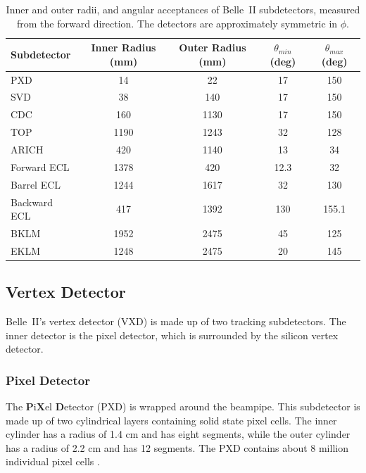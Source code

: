 \begin{table}[ht]
	\centering
	\begin{tabular}{ lcccc }
Subdetector	&	Inner Radius (mm)	&	Outer Radius (mm)	&	$\theta_{min}$ (deg)	&	$\theta_{max}$ (deg)	\\	\hline \hline
PXD	&	14	&	22	&	17	&	150	\\	
SVD	&	38	&	140	&	17	&	150	\\	
CDC	&	160	&	1130	&	17	&	150	\\	
TOP	&	1190	&	1243	&	32	&	128	\\	
ARICH	&	420	&	1140	&	13	&	34	\\	
Forward ECL	&	1378	&	420	&	12.3	&	32	\\	
Barrel ECL	&	1244	&	1617	&	32	&	130	\\	
Backward ECL	&	417	&	1392	&	130	&	155.1	\\	
BKLM	&	1952	&	2475	&	45	&	125	\\	
EKLM	&	1248	&	2475	&	20	&	145	\\	\hline

	\end{tabular}
	\caption[Inner and outer radii, and angular acceptances of Belle~II subdetectors]{Inner and outer radii, and angular acceptances of Belle~II subdetectors, measured from the forward direction. The detectors are approximately symmetric in $\phi$.}
	\label{tab:belleIIaccept}
\end{table}



\subsection{Vertex Detector}
\label{sec:VXD}

	Belle~II's vertex detector (VXD) is made up of two tracking subdetectors. The inner detector is the pixel detector, which is surrounded by the silicon vertex detector.

\subsubsection{Pixel Detector}
\label{sec:PXD}

	The \textbf{P}i\textbf{X}el \textbf{D}etector (PXD) is wrapped around the beampipe. This subdetector is made up of two cylindrical layers containing solid state pixel cells. The inner cylinder has a radius of 1.4 cm and has eight segments, while the outer cylinder has a radius of 2.2 cm and has 12 segments. The PXD contains about 8 million individual pixel cells \cite{BELLE2TDR, schieck2013depfet}.


